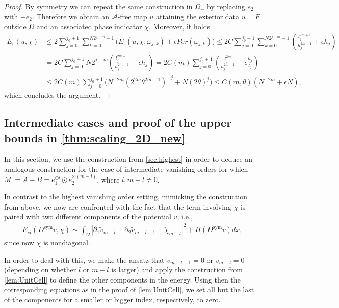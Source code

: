 \documentclass[a4paper, 10pt, twoside, notitlepage]{amsart}
\theoremstyle{plain}
\newcommand{\p}{\partial}
\newcommand{\A}{\mathcal{A}}
\newcommand{\Ds}{D^{\text{sym}}}
\begin{document}
\begin{proof}
			By symmetry we can repeat the same construction in $\Omega_-$ by replacing $e_2$ with $-e_2$. Therefore we obtain an $\A$-free map $u$ attaining the exterior data $u = F$ outside
			$\Omega$ and an associated phase indicator $\chi$.  Moreover, it holds
			\begin{align*}
				E_{\epsilon}(u,\chi) & \leq 2 \sum_{j=0}^{j_0+1} \sum_{k=0}^{N 2^{j-m}-1} \Big(E_\epsilon(u,\chi; \omega_{j,k}) + \epsilon Per(\omega_{j,k})\Big) \leq 2 C \sum_{j=0}^{j_0+1} \sum_{k=0}^{N 2^{j-m}-1} (\frac{l_j^{2m+1}}{h_j^{2m-1}} + \epsilon h_j) \\
				& = 2 C \sum_{j=0}^{j_0+1} N 2^{j-m} (\frac{l_j^{2m+1}}{h_j^{2m-1}} + \epsilon h_j) = 2 C(m) \sum_{j=0}^{j_0+1} (\frac{l_j^{2m}}{h_j^{2m-1}} + \epsilon \frac{h_j}{l_j}) \\
				& \leq 2 C(m) \sum_{j=0}^{j_0+1} \Big(N^{-2m} (2^{2m} \theta^{2m-1})^{-j} + N (2\theta)^j \Big) \leq C(m,\theta)(N^{-2m} + \epsilon N),
			\end{align*}
			which concludes the argument.
		\end{proof}
		
		\subsection{Intermediate cases and proof of the upper bounds in \cref{thm:scaling_2D_new}}
                In this section, we use the construction from \cref{sec:highest} in order to deduce an analogous construction for the case of intermediate vanishing orders for which $M:=A-B = e_1^{\odot l} \odot e_2^{\odot (m-l)}$,
		where $l,m-l \neq 0$.
		
		
		In contrast to the highest vanishing order setting, mimicking the construction from above, we now are confronted with the fact that the term involving $\chi$ is paired with two different components of the potential $v$, i.e.,
		\begin{align*}
			E_{el}(\Ds v,\chi) \sim \int_\Omega |\p_1 \tilde{v}_{m-l} + \p_2 \tilde{v}_{m-l-1} -\tilde{\chi}_{m-l}|^2 + H(\Ds v) dx,
		\end{align*}
		since now $\chi$ is nondiagonal.
		
		In order to deal with this, we make the ansatz that $\tilde{v}_{m-l-1} = 0$ or $\tilde{v}_{m-l}=0$ (depending on whether $l$ or $m-l$ is larger)  and apply the construction from \cref{lem:UnitCell} to define the other components in the energy.
		Using then the corresponding equations as in the proof of \cref{lem:UnitCell}, we set all but the last of the components for a smaller or bigger index, respectively, to zero.
		
\end{document}
